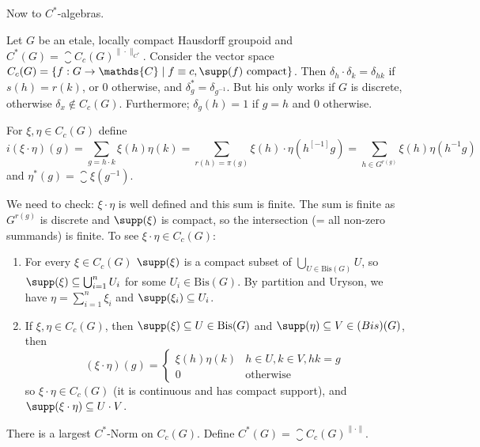 \documentclass[a4paper]{article}
\begin{document}
Now to $C^*$-algebras.

\begin{theorem}
	Let $G$ be an etale, locally compact Hausdorff groupoid	and $C^*(G) = \closure{C_c(G)}^{\|\cdot\|_{C^*}}$.
	Consider the vector space $C_c(G) = \{ f: G \to \mathds{C} \mid f \equiv c, \supp(f) \text{ compact} \}$.
	Then $\delta_h \cdot \delta_k = \delta_{hk}$ if $s(h) = r(k)$, or $0$ otherwise, and $\delta_g^* = \delta_{g^{-1}}$.
	But his only works if $G$ is discrete, otherwise $\delta_x \notin C_c(G)$. 
	Furthermore; $\delta_g(h) = 1$ if $g = h$ and $0$ otherwise. 

	For $\xi, \eta \in C_c(G)$ define 
	\begin{equation*}i
		(\xi \cdot \eta)(g) = \sum_{g = h \cdot k} \xi(h) \eta(k) = \sum_{r(h) = \pi(g)} \xi(h) \cdot \eta(h^[-1] g) = \sum_{h \in G^{r(g)}} \xi(h) \eta(h^{-1} g)
	\end{equation*}
	and $\eta^*(g) = \closure{\xi(g^{-1})}$.

	We need to check: $\xi \cdot \eta$ is well defined and this sum is finite. 
	The sum is finite as $G^{r(g)}$ is discrete and $\supp(\xi)$ is compact, so the intersection (= all non-zero summands) is finite.
	To see $\xi \cdot \eta \in C_c(G)$:
	\begin{enumerate}
		\item For every $\xi \in C_c(G)$ $\supp(\xi)$ is a compact subset of $\bigcup_{U \in \mathrm{Bis}(G)} U$, so $\supp(\xi) \subseteq \bigcup_{i = 1}^n U_i$ for some $U_i \in \mathrm{Bis}(G)$.
		By partition and Uryson, we have $\eta = \sum_{i = 1}^{n} \xi_i$ and $\supp(\xi_i) \subseteq U_i$.
		\item If $\xi, \eta \in C_c(G)$, then $\supp(\xi) \subseteq U \in \mathrm{Bis}(G)$ and $\supp(\eta) \subseteq V \in \mathrm(Bis)(G)$, then
		\begin{equation*}
			(\xi \cdot \eta)(g) = \left\{ \begin{matrix}
				\xi(h) \eta(k) & h \in U, k \in V, hk = g \\
				0 & \text{otherwise}
			\end{matrix} \right.
		\end{equation*}
		so $\xi \cdot \eta \in C_c(G)$ (it is continuous and has compact support), and $\supp(\xi \cdot \eta) \subseteq U \cdot V$.
	\end{enumerate}
\end{theorem}

\begin{theorem}
	There is a largest $C^*$-Norm on $C_c(G)$. Define $C^*(G) = \closure{C_c(G)}^{\|\cdot\|}$.
\end{theorem}
\end{document}
